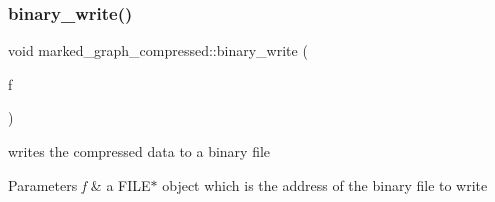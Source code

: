 \subsubsection{\texorpdfstring{binary\+\_\+write()}{binary\_write()}\hspace{0.1cm}{\footnotesize\ttfamily [1/2]}}
{\footnotesize\ttfamily void marked\+\_\+graph\+\_\+compressed\+::binary\+\_\+write (\begin{DoxyParamCaption}\item[{F\+I\+LE $\ast$}]{f }\end{DoxyParamCaption})}



writes the compressed data to a binary file 


\begin{DoxyParams}{Parameters}
{\em f} & a {\ttfamily F\+I\+L\+E$\ast$} object which is the address of the binary file to write \\
\hline
\end{DoxyParams}

